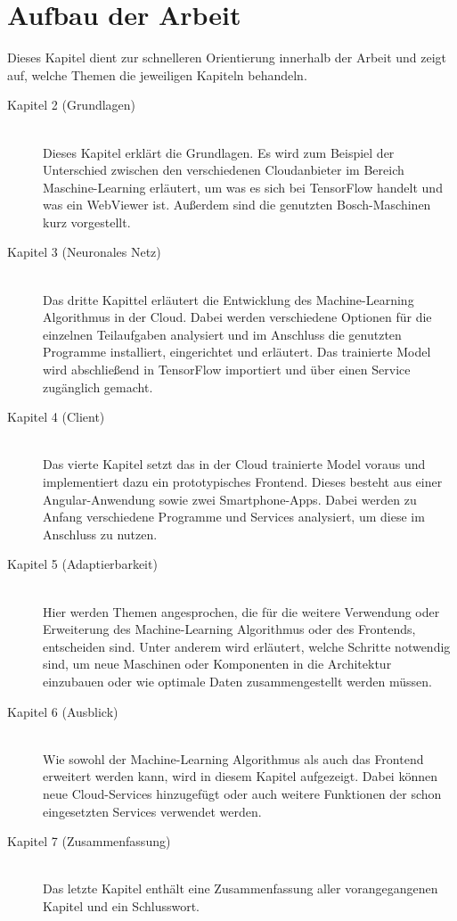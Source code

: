 \newpage

\section{Aufbau der Arbeit}
\label{sec:aufbauDerArbeit}
Dieses Kapitel dient zur schnelleren Orientierung innerhalb der Arbeit und zeigt auf, welche Themen die jeweiligen
Kapiteln behandeln.

\begin{description}

    \item[Kapitel 2 (Grundlagen)]\hfill \\
    Dieses Kapitel erklärt die Grundlagen. Es wird zum Beispiel der Unterschied zwischen den verschiedenen Cloudanbieter
    im Bereich Maschine-Learning erläutert, um was es sich bei TensorFlow handelt und was ein WebViewer ist. Außerdem
    sind die genutzten Bosch-Maschinen kurz vorgestellt.

    \item[Kapitel 3 (Neuronales Netz)]\hfill \\
    Das dritte Kapittel erläutert die Entwicklung des Machine-Learning Algorithmus in der Cloud. Dabei werden verschiedene
    Optionen für die einzelnen Teilaufgaben analysiert und im Anschluss die genutzten Programme installiert, eingerichtet
    und erläutert. Das trainierte Model wird abschließend in TensorFlow importiert und über einen Service zugänglich
    gemacht.

    \item[Kapitel 4 (Client)]\hfill \\
    Das vierte Kapitel setzt das in der Cloud trainierte Model voraus und implementiert dazu ein prototypisches Frontend.
    Dieses besteht aus einer Angular-Anwendung sowie zwei Smartphone-Apps. Dabei werden zu Anfang verschiedene Programme
    und Services analysiert, um diese im Anschluss zu nutzen.

    \item[Kapitel 5 (Adaptierbarkeit)]\hfill \\
    Hier werden Themen angesprochen, die für die weitere Verwendung oder Erweiterung des Machine-Learning Algorithmus
    oder des Frontends, entscheiden sind. Unter anderem wird erläutert, welche Schritte notwendig sind, um neue Maschinen
    oder Komponenten in die Architektur einzubauen oder wie optimale Daten zusammengestellt werden müssen.

    \item[Kapitel 6 (Ausblick)]\hfill \\
    Wie sowohl der Machine-Learning Algorithmus als auch das Frontend erweitert werden kann, wird in diesem Kapitel
    aufgezeigt. Dabei können neue Cloud-Services hinzugefügt oder auch weitere Funktionen der schon eingesetzten Services
    verwendet werden.

    \item[Kapitel 7 (Zusammenfassung)]\hfill \\
    Das letzte Kapitel enthält eine Zusammenfassung aller vorangegangenen Kapitel und ein Schlusswort.

\end{description}